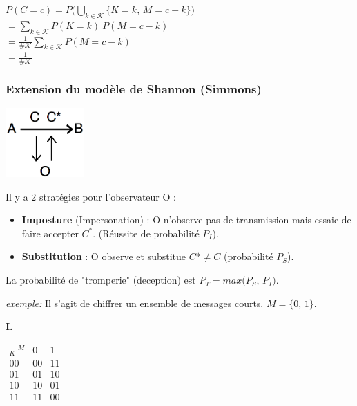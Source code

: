 \documentclass[12pt,a4paper]{article}
\begin{document}
\hspace*{-0.6cm}$P(C=c) = P(\displaystyle\bigcup_{k \in \mathcal{K}} \{ K=k$, $M=c-k\})$\\
\hspace*{1,7cm} $=\displaystyle\sum_{k \in \mathcal{K}} P(K=k)\ P(M=c-k)$\\
\hspace*{1,7cm}	$=\displaystyle\frac{1}{\#\mathcal{K}} \sum_{k \in \mathcal{K}}P(M=c-k)$\\
\hspace*{1,7cm} $=\displaystyle\frac{1}{\#\mathcal{K}}$\\

\subsubsection{Extension du modèle de Shannon (Simmons)}
\begin{center}
\includegraphics[width=3cm]{Simmons.png} 
\end{center}

Il y a 2 stratégies pour l'observateur O :\\

\begin{itemize}
\item \textbf{Imposture} (Impersonation) : O n'observe pas de transmission mais essaie de faire accepter $C^*$. (Réussite de probabilité $P_I$).
\item \textbf{Substitution} : O observe et substitue $C*\neq C$ 
(probabilité $P_S$).
\end{itemize}

	La probabilité de "tromperie" (deception) est $P_T= max(P_S$, $P_I)$.

\bigskip
	
\textit{exemple:} Il s'agit de chiffrer un ensemble de messages courts. $M=\{0$, $1\}$.

\bigskip

\textbf{I.}
\begin{center}
$\begin{array}{c|cc}
_K \ ^M & 0 & 1 \\
\hline
00 & 00 & 11 \\
01 & 01 & 10 \\
10 & 10 & 01 \\
11 & 11 & 00 \\
\end{array}$
\end{center}
\end{document}
